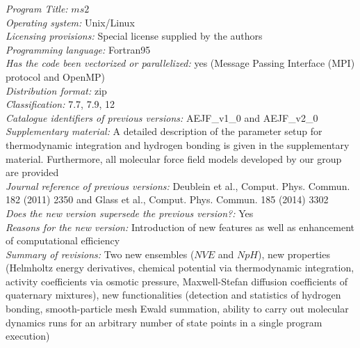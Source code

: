 \documentclass[preprint,12pt]{elsarticle}
\begin{document}
\begin{small}
\noindent
{\em Program Title:} $ms2$\\

\noindent
{\em Operating system:} Unix/Linux\\

\noindent
{\em Licensing provisions:} Special license supplied by the authors \\

\noindent
{\em Programming language:} Fortran95\\

\noindent
{\em Has the code been vectorized or parallelized:} yes (Message Passing Interface (MPI) protocol and OpenMP)\\

\noindent
{\em Distribution format:} zip\\

\noindent
{\em Classification:} 7.7, 7.9, 12\\

\noindent
{\em Catalogue identifiers of previous versions:} AEJF\_v1\_0 and AEJF\_v2\_0\\

\noindent
{\em Supplementary material:} A detailed description of the parameter setup for thermodynamic integration and hydrogen bonding is given in the supplementary material. Furthermore, all molecular force field models developed by our group are provided\\

\noindent
{\em Journal reference of previous versions:} Deublein et al., Comput. Phys. Commun. 182 (2011) 2350 and Glass et al., Comput. Phys. Commun. 185 (2014) 3302\\

\noindent
{\em Does the new version supersede the previous version?:} Yes\\

\noindent
{\em Reasons for the new version:} Introduction of new features as well as enhancement of computational efficiency\\

\noindent
{\em Summary of revisions:} Two new ensembles ($NVE$ and $NpH$), new properties (Helmholtz energy derivatives, chemical potential via thermodynamic integration, activity coefficients via osmotic pressure, Maxwell-Stefan diffusion coefficients of quaternary mixtures), new functionalities (detection and statistics of hydrogen bonding, smooth-particle mesh Ewald summation, ability to carry out molecular dynamics runs for an arbitrary number of state points in a single program execution)\\


\end{small}
\end{document}
